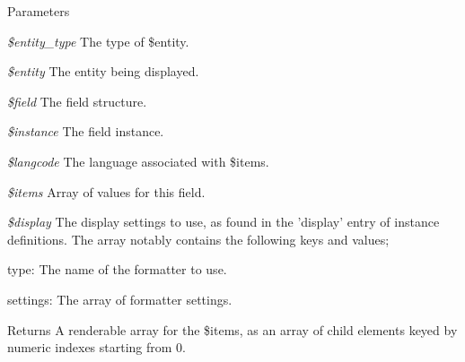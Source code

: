 \begin{DoxyParams}{Parameters}
\item[{\em \$entity\_\-type}]The type of \$entity. \item[{\em \$entity}]The entity being displayed. \item[{\em \$field}]The field structure. \item[{\em \$instance}]The field instance. \item[{\em \$langcode}]The language associated with \$items. \item[{\em \$items}]Array of values for this field. \item[{\em \$display}]The display settings to use, as found in the 'display' entry of instance definitions. The array notably contains the following keys and values;
\begin{DoxyItemize}
\item type: The name of the formatter to use.
\item settings: The array of formatter settings.
\end{DoxyItemize}\end{DoxyParams}
\begin{DoxyReturn}{Returns}
A renderable array for the \$items, as an array of child elements keyed by numeric indexes starting from 0. 
\end{DoxyReturn}
